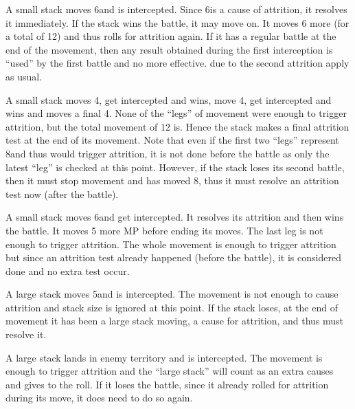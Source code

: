\begin{exemple}
  A small stack moves 6\MP and is intercepted. Since 6\MP is a cause of
  attrition, it resolves it immediately. If the stack wins the battle, it may
  move on. It moves 6 more \MP (for a total of 12) and thus rolls for
  attrition again. If it has a regular battle at the end of the movement, then
  any  result obtained during the first interception is
  ``used'' by the first battle and no more effective.  due to
  the second attrition apply as usual.

  \smallskip

  A small stack moves 4\MP, get intercepted and wins, move 4\MP, get
  intercepted and wins and moves a final 4\MP. None of the ``legs'' of
  movement were enough to trigger attrition, but the total movement of 12\MP
  is. Hence the stack makes a final attrition test at the end of its
  movement. Note that even if the first two ``legs'' represent 8\MP and thus
  would trigger attrition, it is not done before the battle as only the latest
  ``leg'' is checked at this point. However, if the stack loses its second
  battle, then it must stop movement and has moved 8\MP, thus it must resolve
  an attrition test now (after the battle).

  \smallskip

  A small stack moves 6\MP and get intercepted. It resolves its attrition and
  then wins the battle. It moves 5 more MP before ending its moves. The last
  leg is not enough to trigger attrition. The whole movement is enough to
  trigger attrition but since an attrition test already happened (before the
  battle), it is considered done and no extra test occur.

  \smallskip

  A large stack moves 5\MP and is intercepted. The movement is not enough to
  cause attrition and stack size is ignored at this point. If the stack loses,
  at the end of movement it has been a large stack moving, a cause for
  attrition, and thus must resolve it.

  \smallskip

  A large stack lands in enemy territory and is intercepted. The movement is
  enough to trigger attrition and the ``large stack'' will count as an extra
  causes and gives  to the roll. If it loses the battle, since it
  already rolled for attrition during its move, it does need to do so again.
\end{exemple}

